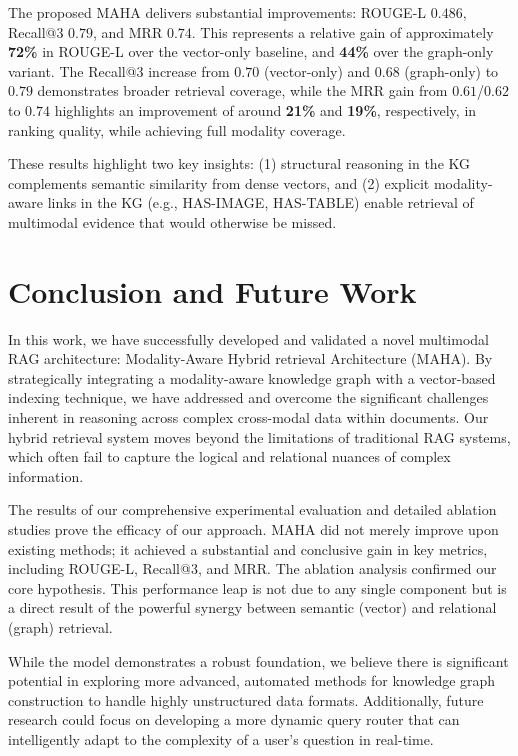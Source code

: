 \documentclass{svproc}
\begin{document}
The proposed MAHA delivers substantial improvements: ROUGE-L $0.486$, Recall@3 $0.79$, and MRR $0.74$. This represents a relative gain of approximately \textbf{72\%} in ROUGE-L over the vector-only baseline, and \textbf{44\%} over the graph-only variant. The Recall@3 increase from $0.70$ (vector-only) and $0.68$ (graph-only) to $0.79$ demonstrates broader retrieval coverage, while the MRR gain from $0.61$/$0.62$ to $0.74$ highlights an improvement of around \textbf{21\%} and \textbf{19\%}, respectively, in ranking quality, while achieving full modality coverage.


These results highlight two key insights: (1) structural reasoning in the KG complements semantic similarity from dense vectors, and (2) explicit modality-aware links in the KG (e.g., HAS-IMAGE, HAS-TABLE) enable retrieval of multimodal evidence that would otherwise be missed.
\section{Conclusion and Future Work}
In this work, we have successfully developed and validated a novel multimodal RAG architecture: Modality-Aware Hybrid retrieval Architecture (MAHA). By strategically integrating a modality-aware knowledge graph with a vector-based indexing technique, we have addressed and overcome the significant challenges inherent in reasoning across complex cross-modal data within documents. Our hybrid retrieval system moves beyond the limitations of traditional RAG systems, which often fail to capture the logical and relational nuances of complex information.

The results of our comprehensive experimental evaluation and detailed ablation studies prove the efficacy of our approach. MAHA did not merely improve upon existing methods; it achieved a substantial and conclusive gain in key metrics, including ROUGE-L, Recall@3, and MRR. The ablation analysis confirmed our core hypothesis. This performance leap is not due to any single component but is a direct result of the powerful synergy between semantic (vector) and relational (graph) retrieval.

While the model demonstrates a robust foundation, we believe there is significant potential in exploring more advanced, automated methods for knowledge graph construction to handle highly unstructured data formats. Additionally, future research could focus on developing a more dynamic query router that can intelligently adapt to the complexity of a user's question in real-time.
\end{document}
